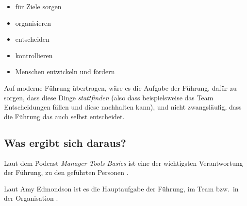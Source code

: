 \begin{itemize}
  \item für Ziele sorgen
  \item organisieren
  \item entscheiden
  \item kontrollieren
  \item Menschen entwickeln und fördern
\end{itemize}

Auf moderne Führung übertragen, wäre es die Aufgabe der Führung, dafür zu sorgen, dass diese Dinge \emph{stattfinden} (also dass beispielsweise das Team Entscheidungen fällen und diese nachhalten kann), und nicht zwangsläufig, dass die Führung das auch selbst entscheidet.


\subsection{Was ergibt sich daraus?}

Laut dem Podcast \emph{Manager Tools Basics} \cite{manager-tools-basics} ist eine der wichtigsten Verantwortung der Führung,  zu den geführten Personen .

Laut Amy Edmondson \cite{the-fearless-organisation} ist es die Hauptaufgabe der Führung, im Team bzw.~in der Organisation .

